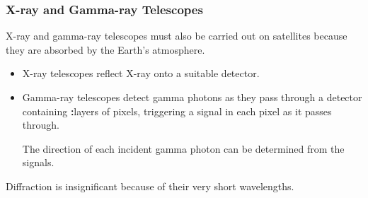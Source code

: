 \subsubsection*{X-ray and Gamma-ray Telescopes}

X-ray and gamma-ray telescopes must also be carried out on satellites because they are absorbed by the Earth's atmosphere.
\begin{itemize}
    \item X-ray telescopes reflect X-ray onto a suitable detector.
    \item Gamma-ray telescopes detect gamma photons as they pass through a detector containing \textbf:layers of pixels, triggering a signal in each pixel as it passes through.

        The direction of each incident gamma photon can be determined from the signals.
\end{itemize}

Diffraction is insignificant because of their very short wavelengths.

